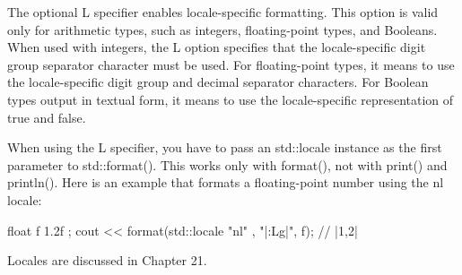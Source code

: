 





















\mySamllsection{\#}





The optional L specifier enables locale-specific formatting. This option is valid only for arithmetic types, such as integers, floating-point types, and Booleans. When used with integers, the L option specifies that the locale-specific digit group separator character must be used. For floating-point types, it means to use the locale-specific digit group and decimal separator characters. For Boolean types output in textual form, it means to use the locale-specific representation of true and false.

When using the L specifier, you have to pass an std::locale instance as the first parameter to std::format(). This works only with format(), not with print() and println(). Here is an example that formats a floating-point number using the nl locale:

\begin{cpp}
float f { 1.2f };
cout << format(std::locale{ "nl" }, "|{:Lg}|\n", f); // |1,2|
\end{cpp}

Locales are discussed in Chapter 21.







